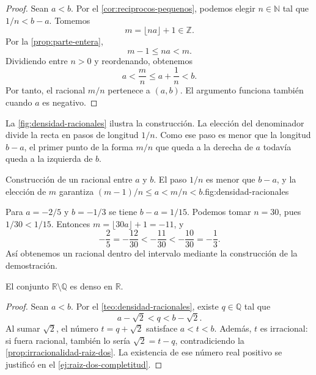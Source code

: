 \begin{proof}
Sean $a<b$. Por el \cref{cor:reciprocos-pequenos}, podemos elegir $n\in\mathbb{N}$ tal que $1/n<b-a$. Tomemos
\[
 m=\lfloor na\rfloor+1\in\mathbb{Z}.
\]
Por la \cref{prop:parte-entera},
\[
 m-1\leq na<m.
\]
Dividiendo entre $n>0$ y reordenando, obtenemos
\[
 a<\frac mn\leq a+\frac1n<b.
\]
Por tanto, el racional $m/n$ pertenece a $(a,b)$. El argumento funciona también cuando $a$ es negativo.
\end{proof}

La \cref{fig:densidad-racionales} ilustra la construcción. La elección del denominador divide la recta en pasos de longitud $1/n$. Como ese paso es menor que la longitud $b-a$, el primer punto de la forma $m/n$ que queda a la derecha de $a$ todavía queda a la izquierda de $b$.

\begin{figuranotas}{Construcción de un racional entre $a$ y $b$. El paso $1/n$ es menor que $b-a$, y la elección de $m$ garantiza $(m-1)/n\leq a<m/n<b$.}{fig:densidad-racionales}

\end{figuranotas}

\begin{example}
Para $a=-2/5$ y $b=-1/3$ se tiene $b-a=1/15$. Podemos tomar $n=30$, pues $1/30<1/15$. Entonces $m=\lfloor30a\rfloor+1=-11$, y
\[
 -\frac25=-\frac{12}{30}
 <-\frac{11}{30}
 <-\frac{10}{30}=-\frac13.
\]
Así obtenemos un racional dentro del intervalo mediante la construcción de la demostración.
\end{example}

\begin{samepage}
\begin{theorem}
\label{teo:densidad-irracionales}
El conjunto $\mathbb{R}\setminus\mathbb{Q}$ es denso en $\mathbb{R}$.
\end{theorem}
\end{samepage}

\begin{proof}
Sean $a<b$. Por el \cref{teo:densidad-racionales}, existe $q\in\mathbb{Q}$ tal que
\[
 a-\sqrt2<q<b-\sqrt2.
\]
Al sumar $\sqrt2$, el número $t=q+\sqrt2$ satisface $a<t<b$. Además, $t$ es irracional: si fuera racional, también lo sería $\sqrt2=t-q$, contradiciendo la \cref{prop:irracionalidad-raiz-dos}. La existencia de ese número real positivo se justificó en el \cref{ej:raiz-dos-completitud}.
\end{proof}

